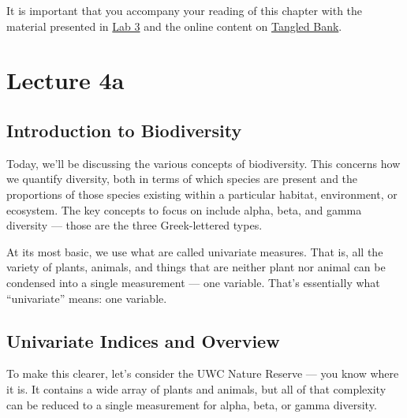 \documentclass[
  10pt,
]{book}
\begin{document}
\begin{tcolorbox}[enhanced jigsaw, leftrule=.75mm, arc=.35mm, title=\textcolor{quarto-callout-note-color}{\faInfo}\hspace{0.5em}{Also see:}, opacityback=0, colframe=quarto-callout-note-color-frame, toprule=.15mm, bottomtitle=1mm, opacitybacktitle=0.6, titlerule=0mm, colback=white, left=2mm, colbacktitle=quarto-callout-note-color!10!white, toptitle=1mm, rightrule=.15mm, breakable, coltitle=black, bottomrule=.15mm]

It is important that you accompany your reading of this chapter with the
material presented in \href{Lab-03-biodiversity.html}{Lab 3} and the
online content on \href{Lec-04-biodiversity.html}{Tangled Bank}.

\end{tcolorbox}

\chapter*{Lecture 4a}\label{lecture-4a}

\section{Introduction to
Biodiversity}\label{introduction-to-biodiversity}

Today, we'll be discussing the various concepts of biodiversity. This
concerns how we quantify diversity, both in terms of which species are
present and the proportions of those species existing within a
particular habitat, environment, or ecosystem. The key concepts to focus
on include alpha, beta, and gamma diversity --- those are the three
Greek-lettered types.

At its most basic, we use what are called univariate measures. That is,
all the variety of plants, animals, and things that are neither plant
nor animal can be condensed into a single measurement --- one variable.
That's essentially what ``univariate'' means: one variable.

\section{Univariate Indices and
Overview}\label{univariate-indices-and-overview}

To make this clearer, let's consider the UWC Nature Reserve --- you know
where it is. It contains a wide array of plants and animals, but all of
that complexity can be reduced to a single measurement for alpha, beta,
or gamma diversity.
\end{document}
